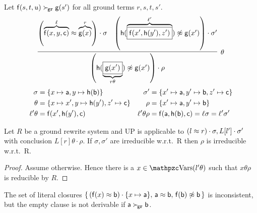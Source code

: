    \begin{example}
        Let \( \mathsf{f}(s,t,u)\mathrel\succ_{\!\mathtt{gr}}\mathsf{g}(s') \) for all ground terms
       \( r,s,t,s' \).
       \begin{gather*}
           \infer[\theta]{
               \left(
                   \mh(\underbrace{
                       \boxed{\mg(x')}
                        }_{r\theta})\mNE\mg(x')
                   \right)\cdot\rho
            }{
               \left(
                   \overbrace{\mf(x,y,\mc)}^{\ell}
                   \mEQ
                   \overbrace{\mg(x)}^r
               \right)\cdot \sigma
            & \left(
               \mh(\overbrace{
                   \boxed{\mf(x',\mh(y'), z')}
                    }^{\ell'})\mNE\mg(x')
               \right)\cdot \sigma'
            }
       \end{gather*}
       \begin{align*}
           \sigma &= \{x\mapsto\mathsf{a}, y\mapsto\mathsf{h}(\mathsf{b})\} &
            \sigma' &= \{x'\mapsto\mathsf{a}, y'\mapsto\mathsf{b}, z'\mapsto\mathsf{c} \}
            \\
            \theta &= \{x\mapsto x',y\mapsto\mathsf{h}(y'),z'\mapsto\mathsf{c} \}
              &
            \rho &=\{ x'\mapsto \mathsf{a}, y'\mapsto \mathsf{b} \}
            \\
            \ell'\theta &= \mathsf{f}(x',\mathsf{h}(y'),\mathsf{c})
             &
            \ell'\theta\rho &= \mathsf{f}(\mathsf{a}, \mathsf{h}(\mathsf{b}), \mathsf{c}) = \ell\sigma = \ell'\sigma'
       \end{align*}
   \end{example}


   \begin{lemma}
        Let \( R \) be a ground rewrite system and UP is applicable to
       \( (l\approx r)\cdot\sigma, L[l']\cdot\sigma' \)
        with conclusion
       \( L[r]\theta\cdot\rho \).
        If \( \sigma,\sigma' \) are irreducible w.r.t.~R then \( \rho \) is irreducible w.r.t.~R.
   \end{lemma}

   \begin{proof}
        Assume otherwise.
        Hence there is a \(
            x\in\var(l'\theta)
        \) such that
       \( x\theta\rho \) is reducible by \(
            R
            \).

   \end{proof}

           \begin{example}
        The set of literal closures
       \( \{ \,
        (\mathsf{f}(x)\approx\mathsf{b})\cdot \{ x\mapsto\mathsf{a} \}, \,
       \mathsf{a}\approx \mathsf{b}, \,
       \mathsf{f}(\mathsf{b})\not\approx\mathsf{b} \,
       \} \) is inconsistent,
        but the empty clause is not derivable
        if \( \mathsf{a}\mathrel\succ_{\!\mathtt{gr}}\mathsf{b} \).
           \end{example}

